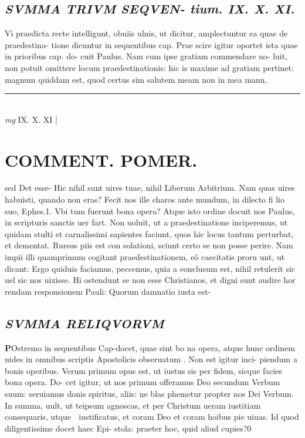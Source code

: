 \documentclass{article}
\begin{document}
\begin{pages}
\subsection*{\textit{SVMMA TRIVM SEQVEN- tium. IX. X. XI.  }}\pstart Vi praedicta recte intelligunt, obuiis ulnis, ut dicitur, amplectuntur ea quae de praedestina-  tione dicuntur in sequentibus cap. Prae scire igitur oportet ista quae in prioribus cap. do- cuit Paulus. Nam cum ipse gratiam commendare uo- luit, non potuit omittere locum praedestinationis: hic is maxime ad gratiam pertinet: magnum quiddam est, quod certus sim salutem meam non in mea manu,  \pend
\vspace{0.5cm}\noindent
\vspace{0.2cm}\rule{1cm}{0.2pt}\\ 
\hspace{0.2cm}\textit{mg}
\footnotesize IX. X. XI 
\normalsize| 
\section*{COMMENT. POMER.  }
\pstart sed Det esse- Hic nihil sunt uires tuae, nihil Liberum Arbitrium. Nam quas uires habuisti, quando non eras? Fecit nos ille charos ante mundum, in dilecto fi lio suo, Ephes.1. Vbi tum fuerunt bona opera? Atque  isto ordine docuit nos Paulus, in scripturis sanctis uer fart. Non uoluit, ut a praedestinatione inciperemus, ut quidam stulti et carnalissimi sapientes faciunt, quos hic locus tantum perturbat, et dementat. Rursus piis est con solationi, sciunt certo se non posse perire. Nam impii illi quamprimum cogitant praedestinationem, eô caecitatis proru unt, ut dicant: Ergo quiduis faciamus, peccemus, quia a eonclusum est, nihil retulerit sic uel sic nos uixisse. Hi ostendunt se non esse Christianos, et digni sunt audire hor rendam responsionem Pauli: Quorum damnatio iusta est-  \pend
{}
{}
\subsection*{\textit{SVMMA RELIQVORVM }}\pstart \huge\textbf{P}\normalsize Ostremo in sequentibus Cap-docet, quae sint bo na opera, atque hunc ordinem uides in omnibus scriptis Apostolicis obseruatum . Non est igitur inci- piendum a bonis operibus. Verum primum opus est, ut iustus sis per fidem, sicque facies bona opera. Do- cet igitur, ut nos primum offeramus Deo secundum Verbum suum: seruiamus donis spiritus, aliis: ne blas phemetur propter nos Dei Verbum. In summa, uult, ut teipsum agnoscas, et per Christum ueram iustitiam consequaris, utque  iustificatus, et coram Deo et coram hoibus pie uiuas. Id quod diligentissime docet haec Epi- stola: praeter hoc, quid aliud cupies?0  \pend
{}
{}

\end{pages}
\end{document}
